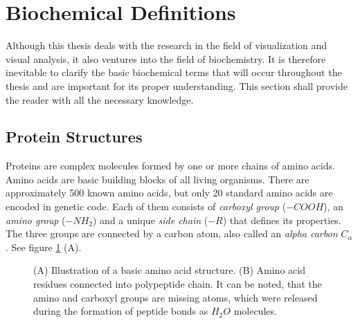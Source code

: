 \section{Biochemical Definitions}
\label{Sec:Chem}
Although this thesis deals with the research in the field of visualization and visual analysis, it also ventures into the field of biochemistry. It is therefore inevitable to clarify the basic biochemical terms that will occur throughout the thesis and are important for its proper understanding. This section shall provide the reader with all the necessary knowledge.

\subsection{Protein Structures}
\label{Sec:structures}
Proteins are complex molecules formed by one or more chains of amino acids. Amino acids are basic building blocks of all living organisms. There are approximately 500 known amino acids, but only 20 standard amino acids are encoded in genetic code. Each of them consists of \textit{carboxyl group} ($-COOH$), an \textit{amino group} ($-NH_2$) and a unique \textit{side chain} ($-R$) that defines its properties. The three groups are connected by a carbon atom, also called an \textit{alpha carbon} $C_\alpha$. See figure \ref{Fig:aa} (A).

\begin{figure}[H]
  \centering
  \caption{(A) Illustration of a basic amino acid structure. (B) Amino acid residues connected into polypeptide chain. It can be noted, that the amino and carboxyl groups are missing atoms, which were released during the formation of peptide bonds as $H_2O$ molecules.}
  \label{Fig:aa}
\end{figure}

